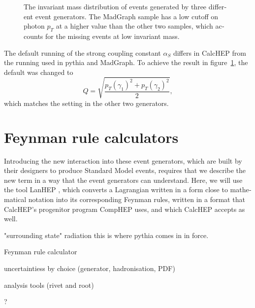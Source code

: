 \begin{english}
\begin{figure}[hbt]
\begin{minipage}[t]{.69\textwidth}
\begin{infilsf}
\hspace{-.9cm}
\end{infilsf}
\end{minipage}
\begin{minipage}[b]{.3\textwidth}
\caption{The invariant mass distribution of events generated by three different event generators. The MadGraph sample has a low cutoff on photon $p_T$ at a higher value than the other two samples, which accounts for the missing events at low invariant mass. \label{evgen}}
\end{minipage}
\end{figure}

The default running of the strong coupling constant $\alpha_S$ differs in CalcHEP from the running used in pythia and MadGraph. To achieve the result in figure~\ref{evgen}, the default was changed to 
\[Q=\sqrt{\frac{p_T(\gamma_1)^2+p_T(\gamma_2)^2}{2}},\]
which matches the setting in the other two generators.

\section{Feynman rule calculators}
Introducing the new interaction into these event generators, which are built by their designers to produce Standard Model events, requires that we describe the new term in a way that the event generators can understand. Here, we will use the tool LanHEP \cite{lanhep}, which converts a Lagrangian written in a form close to \latex mathematical notation into its corresponding Feynman rules, written in a format that CalcHEP's progenitor program CompHEP uses, and which CalcHEP accepts as well.

"surrounding state" radiation this is where pythia comes in in force.

Feynman rule calculator

uncertaintiess by choice (generator, hadronisation, PDF)

analysis tools (rivet and root)

?


\end{english}
